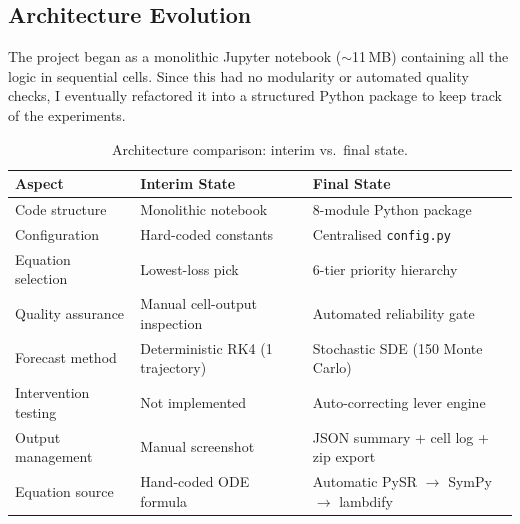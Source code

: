 \documentclass[12pt, a4paper]{article}
\begin{document}
\subsection{Architecture Evolution}

The project began as a monolithic Jupyter notebook ($\sim$11\,MB) containing all the logic in sequential cells. Since this had no modularity or automated quality checks, I eventually refactored it into a structured Python package to keep track of the experiments.

\begin{table}[H]
\centering
\caption{Architecture comparison: interim vs.\ final state.}
\label{tab:arch}
\begin{tabularx}{\textwidth}{p{4.2cm} p{5.2cm} X}
\toprule
\textbf{Aspect} & \textbf{Interim State} & \textbf{Final State} \\
\midrule
Code structure          & Monolithic notebook                & 8-module Python package \\[2pt]
Configuration           & Hard-coded constants               & Centralised \texttt{config.py} \\[2pt]
Equation selection      & Lowest-loss pick                   & 6-tier priority hierarchy \\[2pt]
Quality assurance       & Manual cell-output inspection      & Automated reliability gate \\[2pt]
Forecast method         & Deterministic RK4 (1 trajectory)   & Stochastic SDE (150 Monte Carlo) \\[2pt]
Intervention testing    & Not implemented                    & Auto-correcting lever engine \\[2pt]
Output management       & Manual screenshot                  & JSON summary + cell log + zip export \\[2pt]
Equation source         & Hand-coded ODE formula             & Automatic PySR $\to$ SymPy $\to$ lambdify \\
\bottomrule
\end{tabularx}
\end{table}


\end{document}
